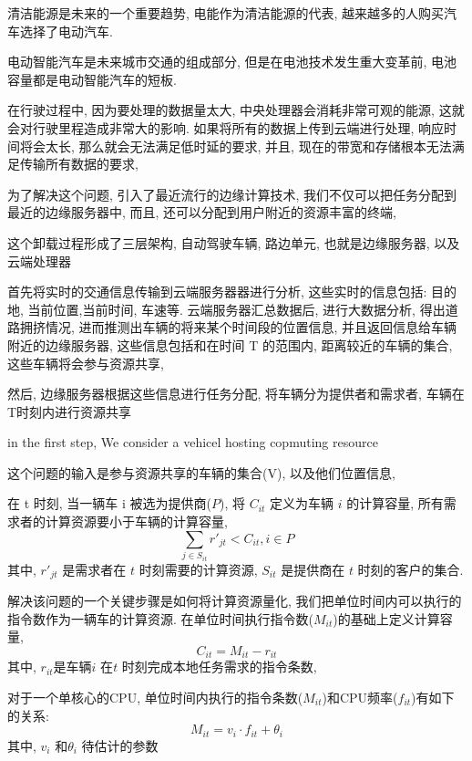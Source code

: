 \documentclass[a4paper]{article}
\begin{document}
清洁能源是未来的一个重要趋势, 电能作为清洁能源的代表, 越来越多的人购买汽车选择了电动汽车. 

电动智能汽车是未来城市交通的组成部分, 但是在电池技术发生重大变革前, 电池容量都是电动智能汽车的短板. 

在行驶过程中, 因为要处理的数据量太大, 中央处理器会消耗非常可观的能源, 这就会对行驶里程造成非常大的影响. 如果将所有的数据上传到云端进行处理, 响应时间将会太长, 那么就会无法满足低时延的要求, 并且, 现在的带宽和存储根本无法满足传输所有数据的要求, 

为了解决这个问题, 引入了最近流行的边缘计算技术, 我们不仅可以把任务分配到最近的边缘服务器中, 而且, 还可以分配到用户附近的资源丰富的终端, 

这个卸载过程形成了三层架构, 自动驾驶车辆, 路边单元, 也就是边缘服务器, 以及云端处理器


首先将实时的交通信息传输到云端服务器器进行分析, 这些实时的信息包括: 目的地, 当前位置,当前时间, 车速等. 云端服务器汇总数据后, 进行大数据分析, 得出道路拥挤情况, 进而推测出车辆的将来某个时间段的位置信息, 并且返回信息给车辆附近的边缘服务器, 这些信息包括和在时间 T 的范围内, 距离较近的车辆的集合, 这些车辆将会参与资源共享, 

然后, 边缘服务器根据这些信息进行任务分配, 将车辆分为提供者和需求者, 车辆在T时刻内进行资源共享 



in the first step, 
We consider a vehicel hosting copmuting resource  

这个问题的输入是参与资源共享的车辆的集合(V), 以及他们位置信息, 

在 t 时刻, 当一辆车 i 被选为提供商($P$), 将 $C_{it}$ 定义为车辆 $i$ 的计算容量, 所有需求者的计算资源要小于车辆的计算容量, 
\begin{equation}
	\sum    \limits_{j \in S_{it}}
	{r'_{jt}} < C_{it}
	,
	  i \in P
\end{equation}
其中, $r'_{jt} $ 是需求者在 $t$ 时刻需要的计算资源, $S_{it}$ 是提供商在 $t$ 时刻的客户的集合. 

解决该问题的一个关键步骤是如何将计算资源量化, 我们把单位时间内可以执行的指令数作为一辆车的计算资源. 在单位时间执行指令数($M_{it}$)的基础上定义计算容量, 
\begin{equation}
	C_{it} = M_{it} - r_{it}
\end{equation}
其中, $r_{it}$是车辆$i$ 在$t$ 时刻完成本地任务需求的指令条数, 

对于一个单核心的CPU, 单位时间内执行的指令条数($M_{it}$)和CPU频率($f_{it}$)有如下的关系:
\begin{equation}
M_{it} = v_i \cdot f_{it} + \theta_i
\end{equation}
其中, $v_{i}$ 和$\theta_i$ 待估计的参数
\end{document}
